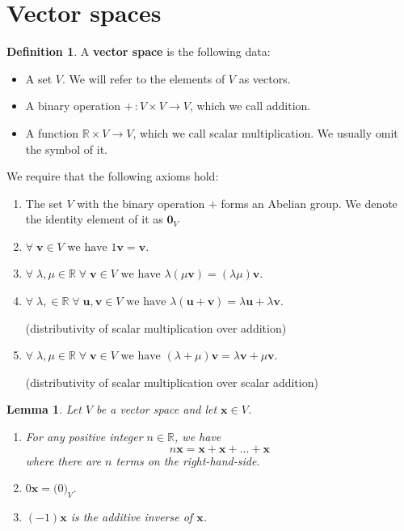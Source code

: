\documentclass[11pt,a4paper]{article}
\newcommand\R{\mathbb{R}}
\newtheorem{lemma}{Lemma}
\theoremstyle{definition}
\newtheorem{definition}{Definition}
\begin{document}
\section{Vector spaces}
\begin{definition}
    A \textbf{vector space} is the following data:
    \begin{itemize}
        \item A set $V$. We will refer to the elements of $V$ as vectors.
        \item A binary operation $ + \, : V \times V \to V $, which we call addition.
        \item A function $ \R \times V \to V $, which we call scalar multiplication. We usually omit the symbol of it.
    \end{itemize}
    We require that the following axioms hold:
    \begin{enumerate}
        \item The set $V$ with the binary operation $+$ forms an Abelian group. We denote the identity element of it as $\mathbf{0}_V$
        \item $ \forall \; \mathbf{v} \in V \text{ we have } 1\mathbf{v} = \mathbf{v} $.
        \item $ \forall \; \lambda, \mu \in \R \; \forall \; \mathbf{v} \in V \text{ we have } \lambda (\mu \mathbf{v}) = (\lambda\mu)\mathbf{v} $.
        \item $ \forall \; \lambda, \in \R \; \forall \; \mathbf{u}, \mathbf{v} \in V \text{ we have } \lambda (\mathbf{u} + \mathbf{v}) = \lambda\mathbf{u} + \lambda\mathbf{v}$.

        (distributivity of scalar multiplication over addition)
        \item $ \forall \; \lambda, \mu \in \R \; \forall \; \mathbf{v} \in V \text{ we have } (\lambda + \mu) \mathbf{v} = \lambda\mathbf{v}  + \mu\mathbf{v} $.

        (distributivity of scalar multiplication over scalar addition)
    \end{enumerate}
\end{definition}

\begin{lemma}
    Let $ V $ be a vector space and let $ \mathbf{x} \in V $.
    \begin{enumerate}
        \item For any positive integer $ n \in \R $, we have 
        \[ n\mathbf{x} = \mathbf{x} + \mathbf{x} + ... + \mathbf{x} \]
        where there are $ n $ terms on the right-hand-side.
        \item $0 \mathbf{x} = \mathbf(0)_V $.
        \item $ (-1)\mathbf{x} $ is the additive inverse of $ \mathbf{x} $.
    \end{enumerate}
\end{lemma}
\end{document}
